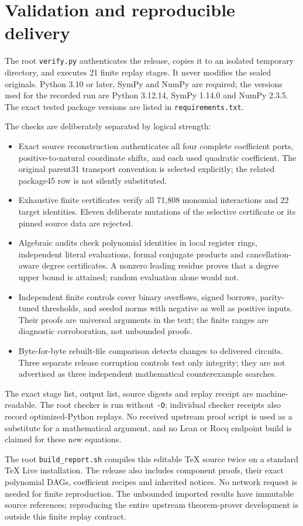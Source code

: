 \section{Validation and reproducible delivery}
The root \texttt{verify.py} authenticates the release, copies it to an
isolated temporary directory, and executes 21 finite replay stages. It
never modifies the sealed originals. Python 3.10 or later, SymPy and NumPy
are required; the versions used for the recorded run are Python 3.12.14,
SymPy 1.14.0 and NumPy 2.3.5. The exact tested package versions are listed
in \texttt{requirements.txt}.

The checks are deliberately separated by logical strength:
\begin{itemize}
\item Exact source reconstruction authenticates all four complete
coefficient ports, positive-to-natural coordinate shifts, and each used
quadratic coefficient. The original parent31 transport convention is
selected explicitly; the related package45 row is not silently substituted.
\item Exhaustive finite certificates verify all 71,808 monomial
interactions and 22 target identities. Eleven deliberate mutations of
the selective certificate or its pinned source data are rejected.
\item Algebraic audits check polynomial identities in local register
rings, independent literal evaluations, formal conjugate products and
cancellation-aware degree certificates. A nonzero leading residue proves
that a degree upper bound is attained; random evaluation alone would not.
\item Independent finite controls cover binary overflows, signed borrows,
parity-tuned thresholds, and seeded norms with negative as well as
positive inputs. Their proofs are universal arguments in the text; the
finite ranges are diagnostic corroboration, not unbounded proofs.
\item Byte-for-byte rebuilt-file comparison detects changes to delivered
circuits. Three separate release corruption controls test only integrity;
they are not advertised as three independent mathematical counterexample
searches.
\end{itemize}
The exact stage list, output list, source digests and replay receipt are
machine-readable. The root checker is run without \texttt{-O}; individual
checker receipts also record optimized-Python replays. No received upstream
proof script is used as a substitute for a mathematical argument, and no
Lean or Rocq endpoint build is claimed for these new equations.

The root \texttt{build\_report.sh} compiles this editable TeX source twice
on a standard TeX Live installation. The release also includes component
proofs, their exact polynomial DAGs, coefficient recipes and inherited
notices. No network request is needed for finite reproduction. The
unbounded imported results have immutable source references; reproducing
the entire upstream theorem-prover development is outside this finite
replay contract.
